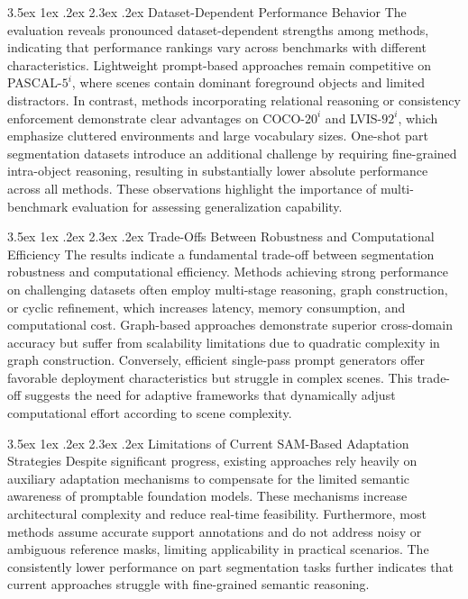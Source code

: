 \documentclass[journal,12pt,onecolumn,draftclsnofoot]{IEEEtran}
\makeatletter
\renewcommand{\section}{\@startsection{section}{1}{\z@}%
    {3.5ex \@plus 1ex \@minus .2ex}%
    {2.3ex \@plus.2ex}%
    {\normalfont\Large\bfseries}}
\makeatother
\begin{document}
\section{Dataset-Dependent Performance Behavior}
The evaluation reveals pronounced dataset-dependent strengths among methods, indicating that performance rankings vary across benchmarks with different characteristics. Lightweight prompt-based approaches remain competitive on PASCAL-$5^i$, where scenes contain dominant foreground objects and limited distractors. In contrast, methods incorporating relational reasoning or consistency enforcement demonstrate clear advantages on COCO-$20^i$ and LVIS-$92^i$, which emphasize cluttered environments and large vocabulary sizes. One-shot part segmentation datasets introduce an additional challenge by requiring fine-grained intra-object reasoning, resulting in substantially lower absolute performance across all methods. These observations highlight the importance of multi-benchmark evaluation for assessing generalization capability.

\section{Trade-Offs Between Robustness and Computational Efficiency}
The results indicate a fundamental trade-off between segmentation robustness and computational efficiency. Methods achieving strong performance on challenging datasets often employ multi-stage reasoning, graph construction, or cyclic refinement, which increases latency, memory consumption, and computational cost. Graph-based approaches demonstrate superior cross-domain accuracy but suffer from scalability limitations due to quadratic complexity in graph construction. Conversely, efficient single-pass prompt generators offer favorable deployment characteristics but struggle in complex scenes. This trade-off suggests the need for adaptive frameworks that dynamically adjust computational effort according to scene complexity.

\section{Limitations of Current SAM-Based Adaptation Strategies}
Despite significant progress, existing approaches rely heavily on auxiliary adaptation mechanisms to compensate for the limited semantic awareness of promptable foundation models. These mechanisms increase architectural complexity and reduce real-time feasibility. Furthermore, most methods assume accurate support annotations and do not address noisy or ambiguous reference masks, limiting applicability in practical scenarios. The consistently lower performance on part segmentation tasks further indicates that current approaches struggle with fine-grained semantic reasoning.
\end{document}
